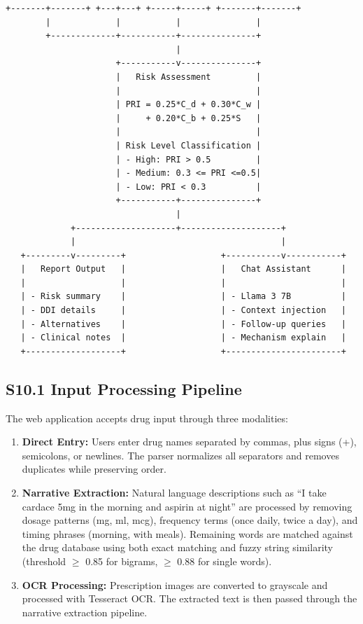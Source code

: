 \documentclass[12pt,a4paper]{article}
\begin{document}
\begin{verbatim}
+-------+-------+ +---+---+ +-----+-----+ +-------+-------+
        |             |           |               |
        +-------------+-----------+---------------+
                                  |
                      +-----------v---------------+
                      |   Risk Assessment         |
                      |                           |
                      | PRI = 0.25*C_d + 0.30*C_w |
                      |     + 0.20*C_b + 0.25*S   |
                      |                           |
                      | Risk Level Classification |
                      | - High: PRI > 0.5         |
                      | - Medium: 0.3 <= PRI <=0.5|
                      | - Low: PRI < 0.3          |
                      +-----------+---------------+
                                  |
             +--------------------+--------------------+
             |                                         |
   +---------v---------+                   +-----------v-----------+
   |   Report Output   |                   |   Chat Assistant      |
   |                   |                   |                       |
   | - Risk summary    |                   | - Llama 3 7B          |
   | - DDI details     |                   | - Context injection   |
   | - Alternatives    |                   | - Follow-up queries   |
   | - Clinical notes  |                   | - Mechanism explain   |
   +-------------------+                   +-----------------------+
\end{verbatim}

\subsection{S10.1 Input Processing Pipeline}

The web application accepts drug input through three modalities:

\begin{enumerate}
\item \textbf{Direct Entry:} Users enter drug names separated by commas, plus signs (+), semicolons, or newlines. The parser normalizes all separators and removes duplicates while preserving order.

\item \textbf{Narrative Extraction:} Natural language descriptions such as ``I take cardace 5mg in the morning and aspirin at night'' are processed by removing dosage patterns (mg, ml, mcg), frequency terms (once daily, twice a day), and timing phrases (morning, with meals). Remaining words are matched against the drug database using both exact matching and fuzzy string similarity (threshold $\geq$ 0.85 for bigrams, $\geq$ 0.88 for single words).

\item \textbf{OCR Processing:} Prescription images are converted to grayscale and processed with Tesseract OCR. The extracted text is then passed through the narrative extraction pipeline.
\end{enumerate}
\end{document}
